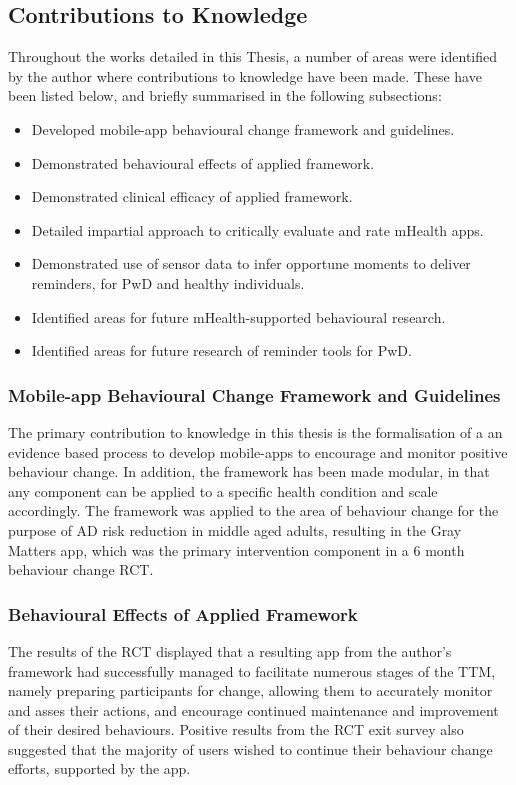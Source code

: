 \subsection{Contributions to Knowledge}
Throughout the works detailed in this Thesis, a number of areas were identified by the author where contributions to knowledge have been made. These have been listed below, and briefly summarised in the following subsections:
\begin{itemize}
	\item Developed mobile-app behavioural change framework and guidelines.
	\item Demonstrated behavioural effects of applied framework.
	\item Demonstrated clinical efficacy of applied framework.
	\item Detailed impartial approach to critically evaluate and rate mHealth apps.
	\item Demonstrated use of sensor data to infer opportune moments to deliver reminders, for PwD and healthy individuals.
	\item Identified areas for future mHealth-supported behavioural research.
	\item Identified areas for future research of reminder tools for PwD.
\end{itemize}
\subsubsection{Mobile-app Behavioural Change Framework and Guidelines}
The primary contribution to knowledge in this thesis is the formalisation of a an evidence based process to develop mobile-apps to encourage and monitor positive behaviour change. In addition, the framework has been made modular, in that any component can be applied to a specific health condition and scale accordingly. The framework was applied to the area of behaviour change for the purpose of AD risk reduction in middle aged adults, resulting in the Gray Matters app, which was the primary intervention component in a 6 month behaviour change RCT.  

\subsubsection{Behavioural Effects of Applied Framework}
The results of the RCT displayed that a resulting app from the author's framework had successfully managed to facilitate numerous stages of the TTM, namely preparing participants for change, allowing them to accurately monitor and asses their actions, and encourage continued maintenance and improvement of their desired behaviours. Positive results from the RCT exit survey also suggested that the majority of users wished to continue their behaviour change efforts, supported by the app. 


